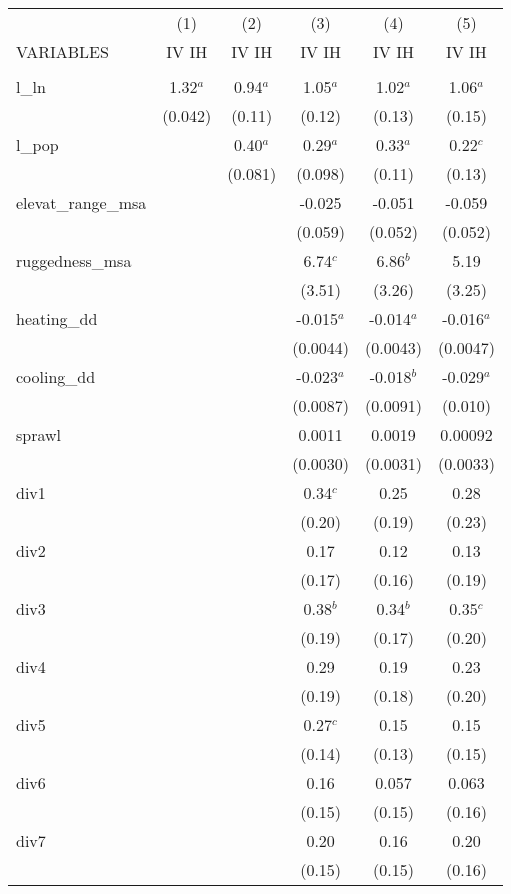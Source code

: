 \documentclass[]{article}
\begin{document}
\begin{tabular}{lccccc} \hline
 & (1) & (2) & (3) & (4) & (5) \\
VARIABLES & IV IH & IV IH & IV IH & IV IH & IV IH \\ \hline
 &  &  &  &  &  \\
l\_ln & 1.32$^a$ & 0.94$^a$ & 1.05$^a$ & 1.02$^a$ & 1.06$^a$ \\
 & (0.042) & (0.11) & (0.12) & (0.13) & (0.15) \\
l\_pop &  & 0.40$^a$ & 0.29$^a$ & 0.33$^a$ & 0.22$^c$ \\
 &  & (0.081) & (0.098) & (0.11) & (0.13) \\
elevat\_range\_msa &  &  & -0.025 & -0.051 & -0.059 \\
 &  &  & (0.059) & (0.052) & (0.052) \\
ruggedness\_msa &  &  & 6.74$^c$ & 6.86$^b$ & 5.19 \\
 &  &  & (3.51) & (3.26) & (3.25) \\
heating\_dd &  &  & -0.015$^a$ & -0.014$^a$ & -0.016$^a$ \\
 &  &  & (0.0044) & (0.0043) & (0.0047) \\
cooling\_dd &  &  & -0.023$^a$ & -0.018$^b$ & -0.029$^a$ \\
 &  &  & (0.0087) & (0.0091) & (0.010) \\
sprawl &  &  & 0.0011 & 0.0019 & 0.00092 \\
 &  &  & (0.0030) & (0.0031) & (0.0033) \\
div1 &  &  & 0.34$^c$ & 0.25 & 0.28 \\
 &  &  & (0.20) & (0.19) & (0.23) \\
div2 &  &  & 0.17 & 0.12 & 0.13 \\
 &  &  & (0.17) & (0.16) & (0.19) \\
div3 &  &  & 0.38$^b$ & 0.34$^b$ & 0.35$^c$ \\
 &  &  & (0.19) & (0.17) & (0.20) \\
div4 &  &  & 0.29 & 0.19 & 0.23 \\
 &  &  & (0.19) & (0.18) & (0.20) \\
div5 &  &  & 0.27$^c$ & 0.15 & 0.15 \\
 &  &  & (0.14) & (0.13) & (0.15) \\
div6 &  &  & 0.16 & 0.057 & 0.063 \\
 &  &  & (0.15) & (0.15) & (0.16) \\
div7 &  &  & 0.20 & 0.16 & 0.20 \\
 &  &  & (0.15) & (0.15) & (0.16) \\

\end{tabular}
\end{document}

